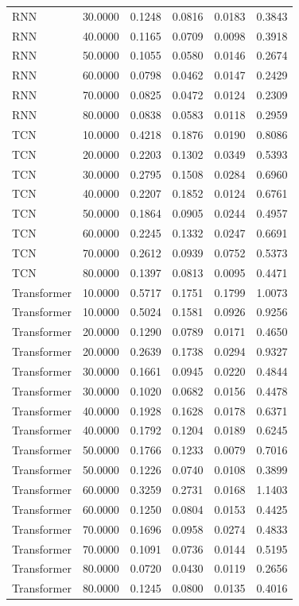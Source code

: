 \begin{tabular}{lrrrrr}
RNN & 30.0000 & 0.1248 & 0.0816 & 0.0183 & 0.3843 \\
RNN & 40.0000 & 0.1165 & 0.0709 & 0.0098 & 0.3918 \\
RNN & 50.0000 & 0.1055 & 0.0580 & 0.0146 & 0.2674 \\
RNN & 60.0000 & 0.0798 & 0.0462 & 0.0147 & 0.2429 \\
RNN & 70.0000 & 0.0825 & 0.0472 & 0.0124 & 0.2309 \\
RNN & 80.0000 & 0.0838 & 0.0583 & 0.0118 & 0.2959 \\
TCN & 10.0000 & 0.4218 & 0.1876 & 0.0190 & 0.8086 \\
TCN & 20.0000 & 0.2203 & 0.1302 & 0.0349 & 0.5393 \\
TCN & 30.0000 & 0.2795 & 0.1508 & 0.0284 & 0.6960 \\
TCN & 40.0000 & 0.2207 & 0.1852 & 0.0124 & 0.6761 \\
TCN & 50.0000 & 0.1864 & 0.0905 & 0.0244 & 0.4957 \\
TCN & 60.0000 & 0.2245 & 0.1332 & 0.0247 & 0.6691 \\
TCN & 70.0000 & 0.2612 & 0.0939 & 0.0752 & 0.5373 \\
TCN & 80.0000 & 0.1397 & 0.0813 & 0.0095 & 0.4471 \\
Transformer & 10.0000 & 0.5717 & 0.1751 & 0.1799 & 1.0073 \\
Transformer & 10.0000 & 0.5024 & 0.1581 & 0.0926 & 0.9256 \\
Transformer & 20.0000 & 0.1290 & 0.0789 & 0.0171 & 0.4650 \\
Transformer & 20.0000 & 0.2639 & 0.1738 & 0.0294 & 0.9327 \\
Transformer & 30.0000 & 0.1661 & 0.0945 & 0.0220 & 0.4844 \\
Transformer & 30.0000 & 0.1020 & 0.0682 & 0.0156 & 0.4478 \\
Transformer & 40.0000 & 0.1928 & 0.1628 & 0.0178 & 0.6371 \\
Transformer & 40.0000 & 0.1792 & 0.1204 & 0.0189 & 0.6245 \\
Transformer & 50.0000 & 0.1766 & 0.1233 & 0.0079 & 0.7016 \\
Transformer & 50.0000 & 0.1226 & 0.0740 & 0.0108 & 0.3899 \\
Transformer & 60.0000 & 0.3259 & 0.2731 & 0.0168 & 1.1403 \\
Transformer & 60.0000 & 0.1250 & 0.0804 & 0.0153 & 0.4425 \\
Transformer & 70.0000 & 0.1696 & 0.0958 & 0.0274 & 0.4833 \\
Transformer & 70.0000 & 0.1091 & 0.0736 & 0.0144 & 0.5195 \\
Transformer & 80.0000 & 0.0720 & 0.0430 & 0.0119 & 0.2656 \\
Transformer & 80.0000 & 0.1245 & 0.0800 & 0.0135 & 0.4016 \\
\bottomrule
\end{tabular}

